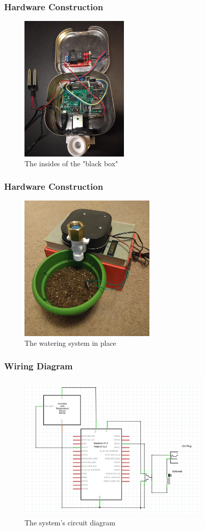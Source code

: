\documentclass{beamer}
\begin{document}
\begin{frame}
    \frametitle{Hardware Construction} %
    \begin{figure}
        \includegraphics[height=7cm]{../img/the-guts}
        \caption{The insides of the "black box"}
    \end{figure}
\end{frame}

\begin{frame}
    \frametitle{Hardware Construction} %
    \begin{figure}
        \includegraphics[height=7cm]{../img/in-use}
        \caption{The watering system in place}
    \end{figure}
\end{frame}

\begin{frame}
    \frametitle{Wiring Diagram}
    \begin{figure}
        \includegraphics[height=7cm]{../img/circuit}
        \caption{The system's circuit diagram}
    \end{figure}
\end{frame}
\end{document}
